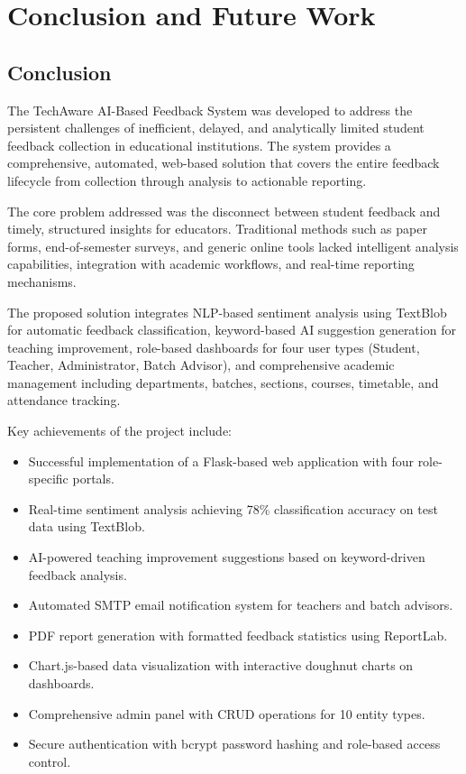 
\chapter{Conclusion and Future Work}

\section{Conclusion}

The TechAware AI-Based Feedback System was developed to address the persistent challenges of inefficient, delayed, and analytically limited student feedback collection in educational institutions. The system provides a comprehensive, automated, web-based solution that covers the entire feedback lifecycle from collection through analysis to actionable reporting.

The core problem addressed was the disconnect between student feedback and timely, structured insights for educators. Traditional methods such as paper forms, end-of-semester surveys, and generic online tools lacked intelligent analysis capabilities, integration with academic workflows, and real-time reporting mechanisms.

The proposed solution integrates NLP-based sentiment analysis using TextBlob for automatic feedback classification, keyword-based AI suggestion generation for teaching improvement, role-based dashboards for four user types (Student, Teacher, Administrator, Batch Advisor), and comprehensive academic management including departments, batches, sections, courses, timetable, and attendance tracking.

Key achievements of the project include:

\begin{itemize}
    \item Successful implementation of a Flask-based web application with four role-specific portals.
    \item Real-time sentiment analysis achieving 78\% classification accuracy on test data using TextBlob.
    \item AI-powered teaching improvement suggestions based on keyword-driven feedback analysis.
    \item Automated SMTP email notification system for teachers and batch advisors.
    \item PDF report generation with formatted feedback statistics using ReportLab.
    \item Chart.js-based data visualization with interactive doughnut charts on dashboards.
    \item Comprehensive admin panel with CRUD operations for 10 entity types.
    \item Secure authentication with bcrypt password hashing and role-based access control.
\end{itemize}

